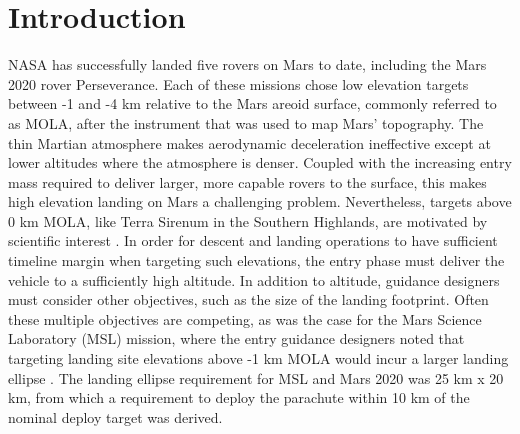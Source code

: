 \documentclass[journal ]{new-aiaa}
\begin{document}
\section*{Introduction}


\lettrine{N}{ASA} has successfully landed five rovers on Mars to date, including the Mars 2020 rover Perseverance. Each of these missions chose low elevation targets between -1 and -4 km relative to the Mars areoid surface, commonly referred to as MOLA, after the instrument that was used to map Mars' topography. The thin Martian atmosphere makes aerodynamic deceleration ineffective except at lower altitudes where the atmosphere is denser. Coupled with the increasing entry mass required to deliver larger, more capable rovers to the surface, this makes high elevation landing on Mars a challenging problem. Nevertheless, targets above 0 km MOLA, like Terra Sirenum in the Southern Highlands, are motivated by scientific interest \cite{MarsWater}. In order for descent and landing operations to have sufficient timeline margin \cite{BraunMarsEDL,MSL_EDL2} when targeting such elevations, the entry phase must deliver the vehicle to a sufficiently high altitude.
In addition to altitude, guidance designers must consider other objectives, such as the size of the landing footprint. Often these multiple objectives are competing, as was the case for the Mars Science Laboratory (MSL) mission, where the entry guidance designers noted that targeting landing site elevations above -1 km MOLA would incur a larger landing ellipse \cite{MSL_EDL2}. The landing ellipse requirement for MSL and Mars 2020 was 25 km x 20 km, from which a requirement to deploy the parachute within 10 km of the nominal deploy target was derived. 
\end{document}
